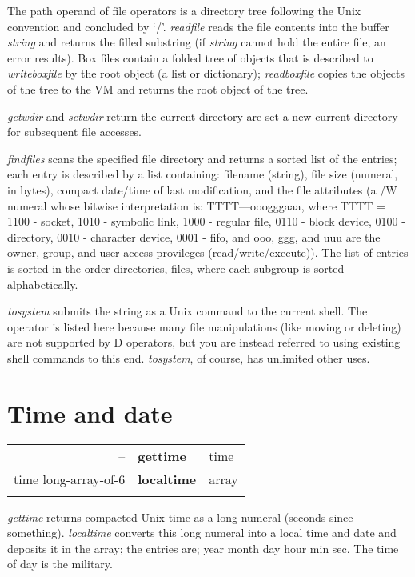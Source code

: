 The path operand of file operators is a directory tree following the Unix convention and concluded by `/'. \emph{readfile} reads the file contents into the buffer \emph{string} and returns the filled substring (if \emph{string} cannot hold the entire file, an error results). Box files contain a folded tree of objects that is described to \emph{writeboxfile} by the root object (a list or dictionary); \emph{readboxfile} copies the objects of the tree to the VM and returns the root object of the tree.

\emph{getwdir} and \emph{setwdir} return the current directory are set a new current directory for subsequent file accesses.

\emph{findfiles} scans the specified file directory and returns a sorted list of the entries; each entry is described by a list containing: filename (string), file size (numeral, in bytes), compact date/time of last modification, and the file attributes (a /W numeral whose bitwise interpretation is: TTTT---ooogggaaa, where TTTT = 1100 - socket, 1010 - symbolic link, 1000 - regular file, 0110 - block device, 0100 - directory, 0010 - character device, 0001 - fifo, and ooo, ggg, and uuu are the owner, group, and user access provileges (read/write/execute)). The list of entries is sorted in the order directories, files, where each subgroup is sorted alphabetically.

\emph{tosystem} submits the string as a Unix command to the current shell. The operator is listed here because many file manipulations (like moving or deleting) are not supported by D operators, but you are instead referred to using existing shell commands to this end. \emph{tosystem}, of course, has unlimited other uses.

\section{Time and date}

\begin{tabular}{>{\sffamily}r>{\sffamily\bfseries}l>{\sffamily}l}
-- & gettime & time\\
time long-array-of-6 & localtime & array\\\\
\end{tabular}

\emph{gettime} returns compacted Unix time as a long numeral (seconds since something). \emph{localtime} converts this long numeral into a local time and date and deposits it in the array; the entries are; year month day hour min sec. The time of day is the military.

